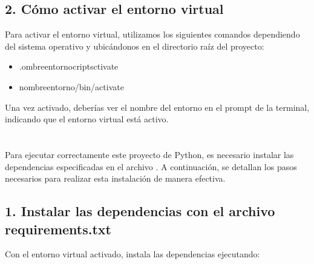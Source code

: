 \documentclass[a4paper,10pt,oneside,spanish,openany]{sphinxmanual}
\begin{document}
\subsection{2. Cómo activar el entorno virtual}
\label{\detokenize{configuracion_inicial/001.env:como-activar-el-entorno-virtual}}
\sphinxAtStartPar
Para activar el entorno virtual, utilizamos los siguientes comandos dependiendo del sistema operativo y ubicándonos en el directorio raíz del proyecto:
\begin{itemize}
\item {} 
\sphinxAtStartPar
{}

\begin{sphinxVerbatim}[commandchars=\\\{\}]
.ombre\PYGZus{}entornocriptsctivate
\end{sphinxVerbatim}

\item {} 
\sphinxAtStartPar
{}

\begin{sphinxVerbatim}[commandchars=\\\{\}]
nombre\PYGZus{}entorno/bin/activate
\end{sphinxVerbatim}

\end{itemize}

\sphinxAtStartPar
Una vez activado, deberías ver el nombre del entorno en el prompt de la terminal, indicando que el entorno virtual está activo.

\sphinxstepscope


\section{}
\label{\detokenize{configuracion_inicial/002.instalacion_librerias:instalacion-de-dependencias-del-proyecto}}\label{\detokenize{configuracion_inicial/002.instalacion_librerias::doc}}
\sphinxAtStartPar
Para ejecutar correctamente este proyecto de Python, es necesario instalar las dependencias especificadas en el archivo . A continuación, se detallan los pasos necesarios para realizar esta instalación de manera efectiva.


\subsection{1. Instalar las dependencias con el archivo requirements.txt}
\label{\detokenize{configuracion_inicial/002.instalacion_librerias:instalar-las-dependencias-con-el-archivo-requirements-txt}}
\sphinxAtStartPar
Con el entorno virtual activado, instala las dependencias ejecutando:
\end{document}
